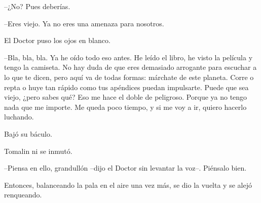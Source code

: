 --¿No? Pues deberías.

--Eres viejo. Ya no eres una amenaza para nosotros.

El Doctor puso los ojos en blanco.

--Bla, bla, bla. Ya he oído todo eso antes. He leído el libro, he visto la película y tengo la camiseta. No hay duda de que eres demasiado arrogante para escuchar a lo que te dicen, pero aquí va de todas formas: márchate de este planeta. Corre o repta o huye tan rápido como tus apéndices puedan impulsarte. Puede que sea viejo, ¿pero sabes qué? Eso me hace el doble de peligroso. Porque ya no tengo nada que me importe. Me queda poco tiempo, y si me voy a ir, quiero hacerlo luchando.

Bajó su báculo.

Tomalin ni se inmutó.

--Piensa en ello, grandullón --dijo el Doctor sin levantar la voz--. Piénsalo bien.

Entonces, balanceando la pala en el aire una vez más, se dio la vuelta y se alejó renqueando.


